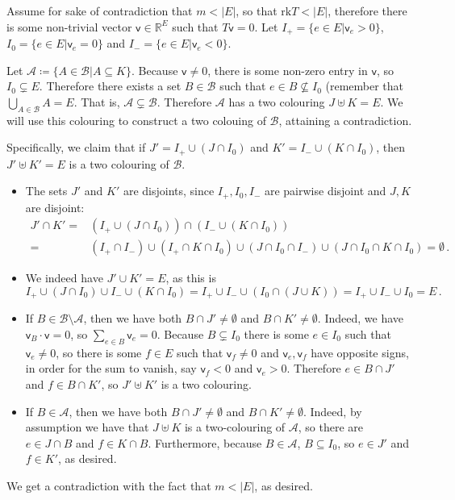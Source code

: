 \documentclass[kulak]{tplt}
\theoremstyle{definition}
\newcommand{\R}{\mathbb{R}}
\newcommand{\vv}{\mathsf{v}}
\newcommand{\rk}{\mathrm{rk}}
\begin{document}
\begin{enumerate}
Assume for sake of contradiction that $m < |E|$, so that $\rk T < |E|$, therefore there is some non-trivial vector $\vv \in \R^E$ such that $T \vv = 0$.
Let $I_+ = \{e \in E | \vv_e > 0\}$, $I_0 = \{e \in E | \vv_e = 0\}$ and $I_- = \{e \in E | \vv_e < 0\}$.

Let $\mathcal A \coloneqq \{ A \in \mathcal B | A \subseteq K\}$.
Because $\vv \neq 0$, there is some non-zero entry in $\vv$, so $I_0\subsetneq E$.
Therefore there exists a set $B \in \mathcal B$ such that $e \in B \not\subseteq I_0$ (remember that $\bigcup_{A \in \mathcal B} A = E$.
That is, $\mathcal A \subsetneq \mathcal B$.
Therefore $\mathcal A$ has a two colouring $J \uplus K = E$.
We will use this colouring to construct a two colouing of $\mathcal B$, attaining a contradiction.

Specifically, we claim that if $J' = I_+ \cup (J \cap I_0) $ and $K' = I_- \cup (K \cap I_0)$, then $J' \uplus K' = E$ is a two colouring of $\mathcal B$.

\begin{itemize}
\item The sets $J'$ and $K'$ are disjoints, since $I_+, I_0, I_-$ are pairwise disjoint and $J, K$ are disjoint:
\begin{align*}
J' \cap K' =& \left( I_+ \cup (J \cap I_0) \right) \cap \left( I_- \cup (K \cap I_0) \right)\\
=& (I_+ \cap I_-) \cup (I_+ \cap K \cap I_0) \cup (J \cap I_0 \cap I_- ) \cup (J \cap I_0 \cap K \cap I_0) = \emptyset \, . 
\end{align*}

\item We indeed have $J' \cup K' = E$, as this is 
$$I_+ \cup (J \cap I_0) \cup I_- \cup (K \cap I_0) = I_+ \cup I_- \cup (I_0 \cap (J \cup K)) = I_+ \cup I_- \cup I_0 = E\, . $$

\item If $B \in \mathcal B \setminus \mathcal A$, then we have both $B \cap J' \neq \emptyset $ and $B \cap K' \neq \emptyset $.
Indeed, we have $\vv_B \cdot \vv = 0 $, so $\sum_{e\in B} \vv_e = 0$.
Because $B \subsetneq I_0$ there is some $e \in I_0$ such that $\vv_e \neq 0$, so there is some $f \in E$ such that $\vv_f\neq 0 $ and $\vv_e, \vv_f$ have opposite signs, in order for the sum to vanish, say $\vv_f <0 $ and $\vv_e > 0$.
Therefore $e \in B \cap J'$ and $f \in B \cap K'$, so $J'\uplus K' $ is a two colouring.

\item If $B \in \mathcal A$, then we have both $B \cap J' \neq \emptyset $ and $B \cap K' \neq \emptyset $.
Indeed, by assumption we have that  $J\uplus K $ is a two-colouring of $\mathcal A$, so there are $e \in J\cap B$ and $f\in K\cap B$.
Furthermore, because $B \in \mathcal A$, $B \subseteq I_0$, so $e \in J'$ and $f \in K'$, as desired. 
\end{itemize}

We get a contradiction with the fact that $m < |E|$, as desired.
\end{enumerate}
\end{document}

